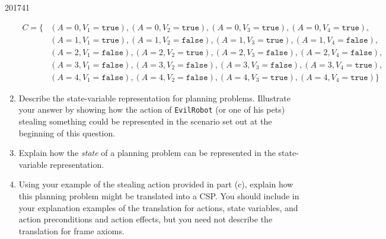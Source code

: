 \documentclass[10pt,\jkfside,a4paper]{article}
\begin{document}
\begin{examquestion}{2017}{4}{1}
\begin{enumerate}[label=(\alph*)]
\[
\begin{split}
C = \{&
(A = 0, V_1 = \texttt{true}),
(A = 0, V_2 = \texttt{true}),
(A = 0, V_3 = \texttt{true}),
(A = 0, V_4 = \texttt{true}), \\
&
(A = 1, V_1 = \texttt{true}),
(A = 1, V_2 = \texttt{false}),
(A = 1, V_3 = \texttt{true}),
(A = 1, V_4 = \texttt{false}), \\
&
(A = 2, V_1 = \texttt{false}),
(A = 2, V_2 = \texttt{true}),
(A = 2, V_3 = \texttt{false}),
(A = 2, V_4 = \texttt{false}), \\
&
(A = 3, V_1 = \texttt{false}),
(A = 3, V_2 = \texttt{false}),
(A = 3, V_3 = \texttt{false}),
(A = 3, V_4 = \texttt{true}), \\
&
(A = 4, V_1 = \texttt{false}),
(A = 4, V_2 = \texttt{false}),
(A = 4, V_3 = \texttt{true}),
(A = 4, V_4 = \texttt{true})\}
\end{split}
\]

\item Describe the state-variable representation for planning problems.
Illustrate your answer by showing how the action of \texttt{EvilRobot} (or one
of his pets) stealing something could be represented in the scenario set out
at the beginning of this question.


\item Explain how the \textit{state} of a planning problem can be
represented in the state-variable representation.


\item Using your example of the stealing action provided in part (c),
explain how this planning problem might be translated into a CSP. You
should include in your explanation examples of the translation for actions,
state variables, and action preconditions and action effects, but you need
not describe the translation for frame axioms.


\end{enumerate}

\end{examquestion}
\end{document}
